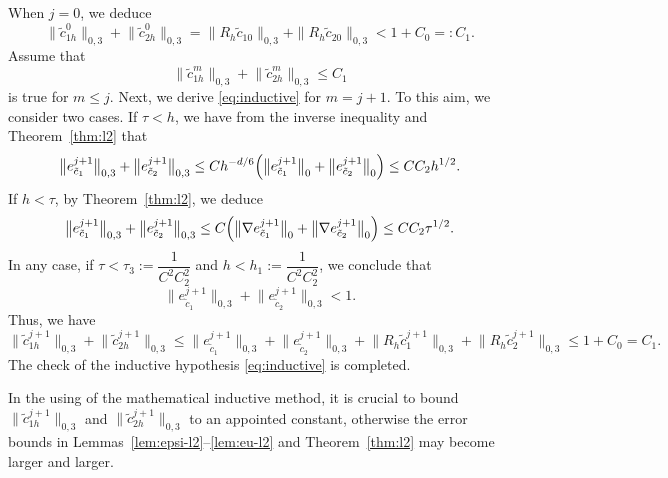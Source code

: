 When $j = 0$, we deduce
\begin{equation}\label{eq:j0-check}
  \bigl\|\tilde{c}_{1h}^{0}\bigr\|_{0,3}
  + \bigl\|\tilde{c}_{2h}^{0}\bigr\|_{0,3}
  = \|R_{h}\tilde{c}_{10}\|_{0,3} + \|R_{h}\tilde{c}_{20}\|_{0,3}
  < 1 + C_{0} =: C_{1}.
\end{equation}
Assume that
\begin{equation}\label{eq:inductive-m}
  \bigl\|\tilde{c}_{1h}^{m}\bigr\|_{0,3}
  + \bigl\|\tilde{c}_{2h}^{m}\bigr\|_{0,3} \leq C_{1}
\end{equation}
is true for $m \leq j$. Next, we derive \eqref{eq:inductive} for $m = j+1$. To this aim, we
consider two cases. If $\tau < h$, we have from the inverse inequality and Theorem~\ref{thm:l2} that
\begin{equation}\label{eq:case1}
  \bigl\|e_{\tilde{c}_{1}}^{j+1}\bigr\|_{0,3}
  + \bigl\|e_{\tilde{c}_{2}}^{j+1}\bigr\|_{0,3}
  \leq Ch^{-d/6}\Bigl(\bigl\|e_{\tilde{c}_{1}}^{j+1}\bigr\|_{0}
                     + \bigl\|e_{\tilde{c}_{2}}^{j+1}\bigr\|_{0}\Bigr)
  \leq CC_{2}h^{1/2}.
\end{equation}
If $h < \tau$, by Theorem~\ref{thm:l2}, we deduce
\begin{equation}\label{eq:case2}
  \bigl\|e_{\tilde{c}_{1}}^{j+1}\bigr\|_{0,3}
  + \bigl\|e_{\tilde{c}_{2}}^{j+1}\bigr\|_{0,3}
  \leq C\Bigl(\bigl\|\nabla e_{\tilde{c}_{1}}^{j+1}\bigr\|_{0}
             + \bigl\|\nabla e_{\tilde{c}_{2}}^{j+1}\bigr\|_{0}\Bigr)
  \leq CC_{2}\tau^{1/2}.
\end{equation}
In any case, if $\tau < \tau_{3} := \dfrac{1}{C^{2}C_{2}^{2}}$ and
$h < h_{1} := \dfrac{1}{C^{2}C_{2}^{2}}$, we conclude that
\begin{equation}\label{eq:err-small}
  \bigl\|e_{\tilde{c}_{1}}^{j+1}\bigr\|_{0,3}
  + \bigl\|e_{\tilde{c}_{2}}^{j+1}\bigr\|_{0,3} < 1.
\end{equation}
Thus, we have
\begin{equation}\label{eq:inductive-verified}
  \bigl\|\tilde{c}_{1h}^{j+1}\bigr\|_{0,3}
  + \bigl\|\tilde{c}_{2h}^{j+1}\bigr\|_{0,3}
  \leq \bigl\|e_{\tilde{c}_{1}}^{j+1}\bigr\|_{0,3}
     + \bigl\|e_{\tilde{c}_{2}}^{j+1}\bigr\|_{0,3}
     + \bigl\|R_{h}\tilde{c}_{1}^{j+1}\bigr\|_{0,3}
     + \bigl\|R_{h}\tilde{c}_{2}^{j+1}\bigr\|_{0,3}
  \leq 1 + C_{0} = C_{1}.
\end{equation}
The check of the inductive hypothesis \eqref{eq:inductive} is completed.

\begin{remark}\label{rem:inductive}
In the using of the mathematical inductive method, it is crucial to bound
$\|\tilde{c}_{1h}^{j+1}\|_{0,3}$ and $\|\tilde{c}_{2h}^{j+1}\|_{0,3}$ to an appointed
constant, otherwise the error bounds in Lemmas~\ref{lem:epsi-l2}--\ref{lem:eu-l2} and
Theorem~\ref{thm:l2} may become larger and larger.
\end{remark}

